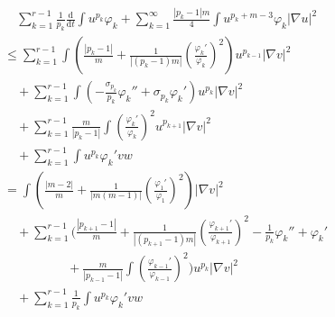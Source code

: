 \documentclass[12pt,]{article}
\begin{document}
\begin{equation}
  \begin{aligned}
    &\quad\sum_{k=1}^{r-1}\frac{1}{p_k}\frac{\mathrm{d}}{\mathrm{d}t}\int u^{p_k}\varphi_k + \sum_{k=1}^{\infty}\frac{|p_k-1|m}{4}\int u^{p_k+m-3}\varphi_k|\nabla u|^2\\
    &\leqslant \sum_{k=1}^{r-1}\int \left(\frac{|p_k-1|}{m}+\frac{1}{|(p_k-1)m|}\left(\frac{\varphi_k'}{\varphi_k}\right)^{2}\right)u^{p_{k-1}}|\nabla v|^{2}\\
    &\quad + \sum_{k=1}^{r-1}\int \left(-\frac{\sigma_{p_k}}{p_k}\varphi_k''+\sigma_{p_k}\varphi_{k}'\right)u^{p_{k}}|\nabla v|^2\\
    &\quad + \sum_{k=1}^{r-1}\frac{m}{|p_k-1|}\int\left(\frac{\varphi_k'}{\varphi_{k}}\right)^2u^{p_{k+1}}|\nabla v|^2\\
    &\quad + \sum_{k=1}^{r-1}\int u^{p_k}\varphi_k'vw\\
    & = \int \left(\frac{|m-2|}{m}+\frac{1}{|m(m-1)|}\left(\frac{\varphi_1'}{\varphi_1}\right)^{2}\right)|\nabla v|^{2}\\
    &\quad + \sum_{k=1}^{r-1}\Bigg(\frac{|p_{k+1}-1|}{m}+\frac{1}{|(p_{k+1}-1)m|}\left(\frac{\varphi_{k+1}'}{\varphi_{k+1}}\right)^{2}-\frac{1}{p_k}\varphi_k'' +\varphi_k' \\
    &\qquad\qquad\quad+\frac{m}{|p_{k-1}-1|}\int\left(\frac{\varphi_{k-1}'}{\varphi_{k-1}}\right)^{2}\Bigg)u^{p_k}|\nabla v|^{2}\\
    & \quad + \sum_{k=1}^{r-1}\frac{1}{p_k}\int u^{p_k}\varphi_k'vw
  \end{aligned}
\end{equation}
\end{document}
